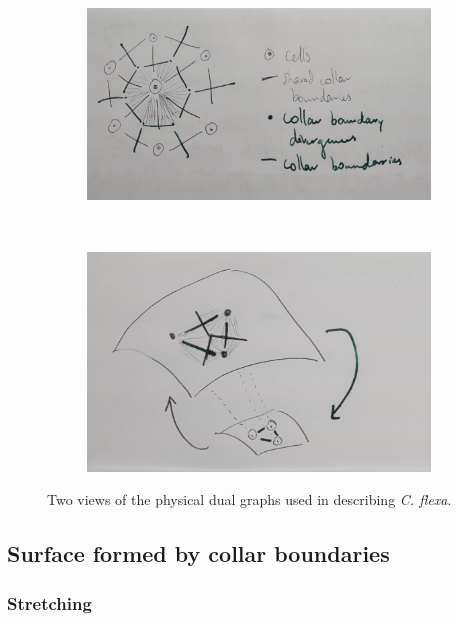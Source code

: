 \begin{figure}[htbp]
    \centering
    \begin{subfigure}[b]{0.52\textwidth}
        \includegraphics[width=\textwidth]{duals1.jpg}
        \caption{}
        \label{subfig:duals1}
    \end{subfigure}
    ~
    \begin{subfigure}[b]{0.46\textwidth}
        \includegraphics[width=\textwidth]{duals2.jpg}
        \caption{}
        \label{subfig:duals2}
    \end{subfigure}
    \caption{Two views of the physical dual graphs used in describing \textit{C. flexa}.}
    \label{fig:duals}
\end{figure}

\subsection{Surface formed by collar boundaries}
\subsubsection{Stretching}

